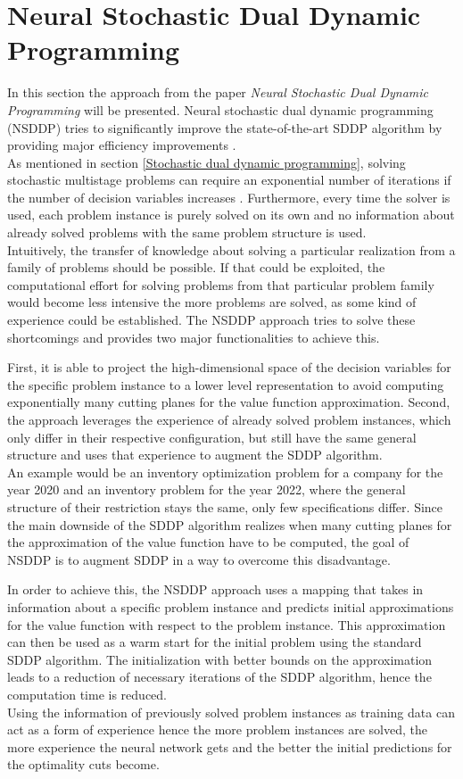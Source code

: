 \section{Neural Stochastic Dual Dynamic Programming}\label{Neural stochastic dual dynamic programming}
In this section the approach from the paper \textit{Neural Stochastic Dual Dynamic Programming} will be presented.
Neural stochastic dual dynamic programming (NSDDP) tries to significantly improve the state-of-the-art SDDP algorithm by providing major efficiency improvements \cite{NSDDP}. \\
As mentioned in section \ref{Stochastic dual dynamic programming}, solving stochastic multistage problems can require an exponential number of iterations if the number of decision variables increases \cite{NSDDP}.
Furthermore, every time the solver is used, each problem instance is purely solved on its own and no information about already solved problems with the same problem structure is used. \\
Intuitively, the transfer of knowledge about solving a particular realization from a family of problems should be possible.
If that could be exploited, the computational effort for solving problems from that particular problem family would become less intensive the more problems are solved, as some kind of experience could be established.
The NSDDP approach tries to solve these shortcomings and provides two major functionalities to achieve this.

First, it is able to project the high-dimensional space of the decision variables for the specific problem instance to a lower level representation to avoid computing exponentially many cutting planes for the value function approximation.
Second, the approach leverages the experience of already solved problem instances, which only differ in their respective configuration, but still have the same general structure and uses that experience to augment the SDDP algorithm. \\
An example would be an inventory optimization problem for a company for the year 2020 and an inventory problem for the year 2022, where the general structure of their restriction stays the same, only few specifications differ.
Since the main downside of the SDDP algorithm realizes when many cutting planes for the approximation of the value function have to be computed, the goal of NSDDP is to augment SDDP in a way to overcome this disadvantage.

In order to achieve this, the NSDDP approach uses a mapping that takes in information about a specific problem instance and predicts initial approximations for the value function with respect to the problem instance.
This approximation can then be used as a warm start for the initial problem using the standard SDDP algorithm.
The initialization with better bounds on the approximation leads to a reduction of necessary iterations of the SDDP algorithm, hence the computation time is reduced. \\
Using the information of previously solved problem instances as training data can act as a form of experience hence the more problem instances are solved, the more experience the neural network gets and  the better the initial predictions for the optimality cuts become.

